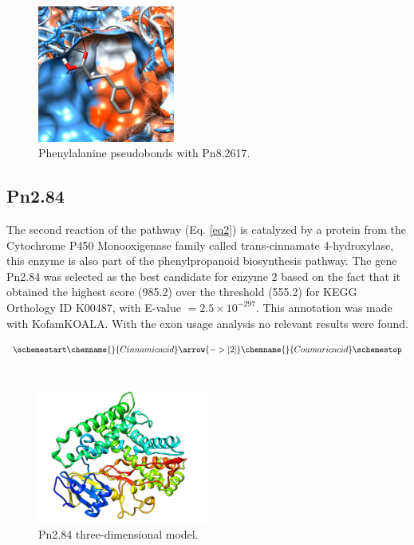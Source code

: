 \documentclass[12pt]{article}
\begin{document}
	\FloatBarrier
	
	\FloatBarrier
	\begin{figure}[h!]
		\centering
		\includegraphics[width=0.4\textwidth]{../1/Dock/chimera.png}
		\caption{\centering Phenylalanine pseudobonds with Pn8.2617.}
		\label{fig1_4}
	\end{figure}
	\FloatBarrier
	
	\subsection{Pn2.84}\label{ssec:Pn2.84}
	
	The second reaction of the pathway (Eq. \ref{eq2}) is catalyzed by a protein from the Cytochrome P450 Monooxigenase family called trans-cinnamate 4-hydroxylase, this enzyme is also part of the phenylpropanoid biosynthesis pathway. The gene Pn2.84 was selected as the best candidate for enzyme 2 based on the fact that it obtained the highest score (985.2) over the threshold (555.2) for KEGG Orthology ID K00487, with E-value $=2.5\times10^{-297}$. This annotation was made with KofamKOALA. \cite{kofamkoala} With the exon usage analysis no relevant results were found.
	
	\begin{equation}
	\schemestart
	\label{eq2}
	\chemname{\footnotesize}{Cinnamic acid}\arrow{->[ 2]}\chemname{\footnotesize}{Coumaric acid}
	\schemestop
	\end{equation}\\
	
	\FloatBarrier
	\begin{figure}
		\centering
		\includegraphics[width=0.5\textwidth]{../2/Minimize/model.png}
		\caption{\centering Pn2.84 three-dimensional model.}
		\label{fig2_1}
	\end{figure}
	\FloatBarrier
	
\end{document}
